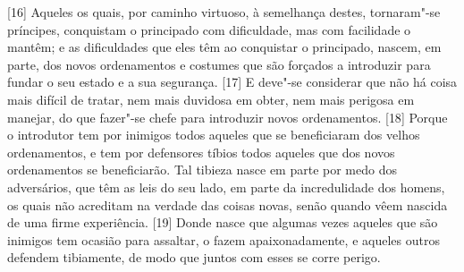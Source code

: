 {[}16{]} Aqueles os quais, por caminho virtuoso, à semelhança destes,
tornaram"-se príncipes, conquistam o principado com dificuldade, mas com
facilidade o mantêm; e as dificuldades que eles têm ao conquistar o
principado, nascem, em parte, dos novos ordenamentos e costumes que são
forçados a introduzir para fundar o seu estado e a sua segurança.
{[}17{]} E deve"-se considerar que não há coisa mais difícil de tratar,
nem mais duvidosa em obter, nem mais perigosa em manejar, do que
fazer"-se chefe para introduzir novos ordenamentos. {[}18{]} Porque o
introdutor tem por inimigos todos aqueles que se beneficiaram dos velhos
ordenamentos, e tem por defensores tíbios todos aqueles que dos novos
ordenamentos se beneficiarão. Tal tibieza nasce em parte por medo dos
adversários, que têm as leis do seu lado, em parte da incredulidade dos
homens, os quais não acreditam na verdade das coisas novas, senão quando
vêem nascida de uma firme experiência. {[}19{]} Donde nasce que algumas
vezes aqueles que são inimigos tem ocasião para assaltar, o fazem
apaixonadamente, e aqueles outros defendem tibiamente, de modo que
juntos com esses se corre perigo.

